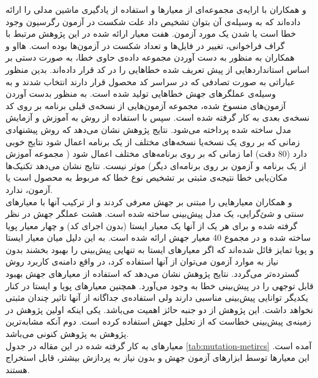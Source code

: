  و همکاران با ارایه‌ی مجموعه‌ای از معیارها و استفاده از یادگیری ماشین مدلی را ارائه داده‌اند که به وسیله‌ی آن بتوان تشخیص داد علت شکست در آزمون رگرسیون وجود خطا است یا  شدن یک مورد آزمون\cite{hao2013bug}. هفت معیار ارائه شده در این پژوهش مرتبط با گراف فراخوانی، تغییر در فایل‌ها و تعداد شکست در آزمون‌ها بوده است.  هااو و همکاران به منظور به دست آوردن مجموعه داده‌ی حاوی خطا، به صورت دستی بر اساس استانداردهایی  از پیش تعریف شده خطاهایی را در کد قرار داده‌اند. بدین منظور عباراتی به صورت تصادفی که در سراسر کد محصول قرار دارند انتخاب شدند و به وسیله‌ی عملگرهای جهش خطاهایی تولید شده است. به منظور بدست آوردن آزمون‌های منسوخ شده، مجموعه آزمون‌هایی از نسخه‌ی قبلی برنامه بر روی کد  نسخه‌ی بعدی به کار گرفته شده است. سپس با استفاده از روش  به آموزش و آزمایش مدل ساخته شده پرداخته می‌شود. نتایج پژوهش نشان می‌دهد که روش پیشنهادی زمانی که بر روی یک نسخه‌یا نسخه‌های مختلف از یک برنامه اعمال شود نتایج خوبی دارد (80\lr{\%} دقت) اما زمانی که بر روی برنامه‌های مختلف اعمال شود ( مجموعه آموزش از یک برنامه و آزمون بر روی برنامه‌ای دیگر) موثر نیست. نتایج نشان می‌دهد تکنیک‌ها مکان‌یابی خطا نتیجه‌ی مثبتی بر تشخیص نوع خطا که مربوط به محصول است یا آزمون، ندارد.\\
 
 و همکاران معیارهایی را مبتنی بر جهش معرفی کردند و  از ترکیب آنها با معیارهای سنتی و شئ‌گرایی، یک مدل پیش‌بینی ساخته شده است\cite{bowes2016mutation}. هشت عملگر جهش در نظر گرفته شده و برای هر یک از آنها یک معیار ایستا (بدون اجرای کد) و چهار معیار پویا ساخته شده و در مجموع 40 معیار جهش ارائه شده است. به این دلیل میان معیار ایستا و پویا تمایز قائل شده‌اند که اگر معیارهای ایستا به تنهایی  پیش‌بینی را بهبود بخشند بدون نیاز به موارد آزمون می‌توان از آنها استفاده کرد، در واقع دامنه‌ی کاربرد روش گسترده‌تر می‌گردد. نتایج پژوهش نشان می‌دهد که استفاده از معیارهای جهش بهبود قابل توجهی را در پیش‌بینی خطا به وجود می‌آورد. همچنین معیارهای پویا و ایستا در کنار یکدیگر توانایی پیش‌بینی مناسبی دارند ولی استفاده‌ی جداگانه از آنها تاثیر چندان مثبتی نخواهد داشت. این پژوهش از دو جنبه حائز اهمیت می‌باشد. یکی اینکه اولین پژوهش در زمینه‌ی پیش‌بینی خطاست که از تحلیل جهش استفاده کرده است. دوم آنکه مشابه‌ترین پژوهش به پژوهش کنونی می‌باشد. \\
معیارهای به کار گرفته شده در این مقاله در جدول \ref{tab:mutation-metircs} آمده است. این معیارها  توسط ابزارهای آزمون جهش  و بدون نیاز به پردازش بیشتر، قابل استخراج هستند.


